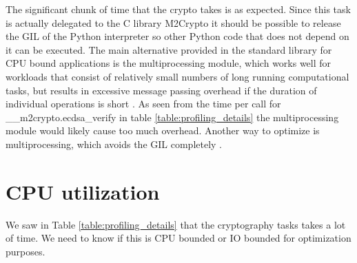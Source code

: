 The significant chunk of time that the crypto takes is as expected.
Since this task is actually delegated to the C library M2Crypto it should be possible to release the GIL of the Python interpreter so other Python code that does not depend on it can be executed.
The main alternative provided in the standard library for CPU bound applications is the multiprocessing module, which works well for workloads that consist of relatively small numbers of long running computational tasks, but results in excessive message passing overhead if the duration of individual operations is short \cite{http://python-notes.curiousefficiency.org/en/latest/python3/multicore_python.html}.
As seen from the time per call for \_\_m2crypto.ecdsa\_verify in table \ref{table:profiling_details} the multiprocessing module would likely cause too much overhead.
Another way to optimize is multiprocessing, which avoids the GIL completely \cite{quinten}.

\section{CPU utilization}\label{sec:cpu_utilization}
We saw in Table \ref{table:profiling_details} that the cryptography tasks takes a lot of time.
We need to know if this is CPU bounded or IO bounded for optimization purposes.

